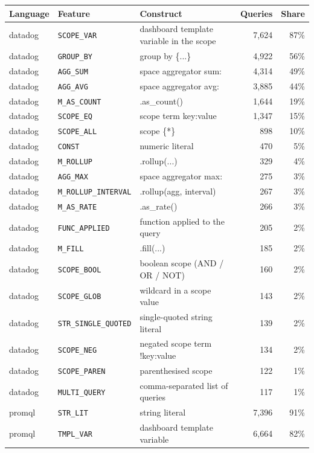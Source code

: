 \begin{tabular}{@{}lllrr@{}}
\toprule
Language & Feature & Construct & Queries & Share \\
\midrule
datadog & \texttt{SCOPE\_VAR} & dashboard template variable in the scope & 7,624 & 87\% \\
datadog & \texttt{GROUP\_BY} & group by \{...\} & 4,922 & 56\% \\
datadog & \texttt{AGG\_SUM} & space aggregator sum: & 4,314 & 49\% \\
datadog & \texttt{AGG\_AVG} & space aggregator avg: & 3,885 & 44\% \\
datadog & \texttt{M\_AS\_COUNT} & .as\_count() & 1,644 & 19\% \\
datadog & \texttt{SCOPE\_EQ} & scope term key:value & 1,347 & 15\% \\
datadog & \texttt{SCOPE\_ALL} & scope \{*\} & 898 & 10\% \\
datadog & \texttt{CONST} & numeric literal & 470 & 5\% \\
datadog & \texttt{M\_ROLLUP} & .rollup(...) & 329 & 4\% \\
datadog & \texttt{AGG\_MAX} & space aggregator max: & 275 & 3\% \\
datadog & \texttt{M\_ROLLUP\_INTERVAL} & .rollup(agg, interval) & 267 & 3\% \\
datadog & \texttt{M\_AS\_RATE} & .as\_rate() & 266 & 3\% \\
datadog & \texttt{FUNC\_APPLIED} & function applied to the query & 205 & 2\% \\
datadog & \texttt{M\_FILL} & .fill(...) & 185 & 2\% \\
datadog & \texttt{SCOPE\_BOOL} & boolean scope (AND / OR / NOT) & 160 & 2\% \\
datadog & \texttt{SCOPE\_GLOB} & wildcard in a scope value & 143 & 2\% \\
datadog & \texttt{STR\_SINGLE\_QUOTED} & single-quoted string literal & 139 & 2\% \\
datadog & \texttt{SCOPE\_NEG} & negated scope term !key:value & 134 & 2\% \\
datadog & \texttt{SCOPE\_PAREN} & parenthesised scope & 122 & 1\% \\
datadog & \texttt{MULTI\_QUERY} & comma-separated list of queries & 117 & 1\% \\
promql & \texttt{STR\_LIT} & string literal & 7,396 & 91\% \\
promql & \texttt{TMPL\_VAR} & dashboard template variable & 6,664 & 82\% \\

\end{tabular}
